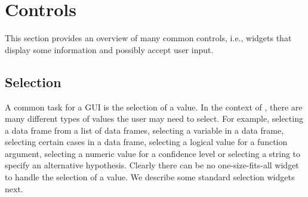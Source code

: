 \section{Controls}
\label{sec:GUI:basic-components}
This section provides an overview of many common controls, i.e.,
widgets that display some information and possibly accept user input.




\subsection{Selection}
\label{sec:GUI:basic-selection}

A common task for a GUI is the selection of a value. In the context of
\R\/, there are many different types of values the user may need to
select. For example, selecting a data frame from a list of data
frames, selecting a variable in a data frame, selecting certain cases
in a data frame, selecting a logical value for a function argument,
selecting a numeric value for a confidence level or selecting a string
to specify an alternative hypothesis. Clearly there can be no
one-size-fits-all widget to handle the selection of a value. We
describe some standard selection widgets next. 



